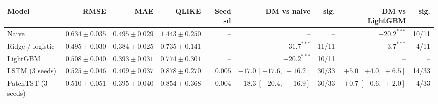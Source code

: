 \begin{tabular}{lrrrrrrrr}
\toprule
Model & RMSE & MAE & QLIKE & Seed sd & DM vs naive & sig. & DM vs LightGBM & sig. \\
\midrule
Naive & $0.634 \pm 0.035$ & $0.495 \pm 0.029$ & $1.443 \pm 0.250$ & -- & -- & -- & $+20.2^{***}$ & 10/11 \\
Ridge / logistic & $0.495 \pm 0.030$ & $0.384 \pm 0.025$ & $0.735 \pm 0.141$ & -- & $-31.7^{***}$ & 11/11 & $-3.7^{***}$ & 4/11 \\
LightGBM & $0.508 \pm 0.040$ & $0.393 \pm 0.031$ & $0.774 \pm 0.301$ & -- & $-20.2^{***}$ & 10/11 & -- & -- \\
LSTM (3 seeds) & $0.525 \pm 0.046$ & $0.409 \pm 0.037$ & $0.878 \pm 0.270$ & $0.005$ & $-17.0\ [-17.6,\ -16.2]$ & 30/33 & $+5.0\ [+4.0,\ +6.5]$ & 14/33 \\
PatchTST (3 seeds) & $0.510 \pm 0.051$ & $0.395 \pm 0.040$ & $0.854 \pm 0.368$ & $0.004$ & $-18.3\ [-20.4,\ -16.9]$ & 30/33 & $+0.7\ [-0.6,\ +2.0]$ & 4/33 \\
\bottomrule
\end{tabular}
